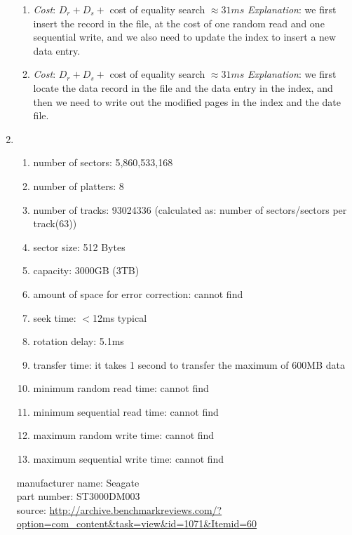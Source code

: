 \documentclass[10pt]{article}
\begin{document}
\begin{enumerate}
\begin{enumerate}
\item \emph{Cost}: $D_r + D_s + $ cost of equality search $\approx 31ms$
  \emph{Explanation}: we first insert the record in the file, at the
  cost of one random read and one sequential write, and we also need
  to update the index to insert a new data entry.
\item \emph{Cost}: $D_r + D_s + $ cost of equality search $\approx 31ms$
  \emph{Explanation}: we first locate the data record in the file and
  the data entry in the index, and then we need to write out the
  modified pages in the index and the date file.
\end{enumerate}

\item 
\begin{enumerate}
\item number of sectors: 5,860,533,168
\item number of platters: 8
\item number of tracks: 93024336 (calculated as: number of
  sectors/sectors per track(63))
\item sector size: 512 Bytes
\item capacity: 3000GB (3TB)
\item amount of space for error correction: cannot find
\item seek time: $<$12ms typical
\item rotation delay: 5.1ms
\item transfer time: it takes 1 second to transfer the maximum of
  600MB data
\item minimum random read time: cannot find
\item minimum sequential read time: cannot find
\item maximum random write time: cannot find
\item maximum sequential write time: cannot find
\end{enumerate}
manufacturer name: Seagate\\
part number: ST3000DM003\\
source: \url{http://archive.benchmarkreviews.com/?option=com_content&task=view&id=1071&Itemid=60}

\end{enumerate}
\end{document}
